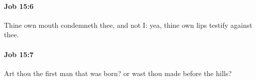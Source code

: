 		\paragraph{Job 15:6} %
			\label{JOB-15-6}

			Thine own mouth condemneth thee, and not I: yea, thine own lips testify against thee.


		\paragraph{Job 15:7} %
			\label{JOB-15-7}

			Art thou the first man that was born? or wast thou made before the hills?


